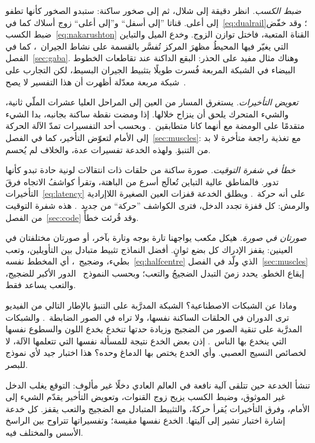 \emph{ضبط الكسب.} انظر دقيقة إلى شلال، ثم إلى صخور ساكنة: ستبدو الصخور كأنها تطفو إلى أعلى. قناتا ”إلى أسفل“ و”إلى أعلى“ زوج أسلاك كما في~\eqref{eq:dualrail}؛ وقد خفّض ضبط الكسب~\eqref{eq:nakarushton} القناة المتعبة، فاختل توازن الزوج. وخدع الميل والتباين التي يغيّر فيها المحيطُ مظهرَ المركز تُفسَّر بالقسمة على نشاط الجيران~\cite{Schwartz2009}، كما في الفصل~\ref{sec:gaba}. وهناك مثال مفيد على الحذر: البقع الداكنة عند تقاطعات الخطوط البيضاء في الشبكة المربعة فُسرت طويلًا بتثبيط الجيران البسيط، لكن التجارب على شبكة مربعة معدّلة أظهرت أن هذا التفسير لا يصح~\cite{SchillerCarvey2005}.

\emph{تعويض التأخيرات.} يستغرق المسار من العين إلى المراحل العليا عشرات الملّي ثانية، والشيء المتحرك يلحق أن ينزاح خلالها. إذا ومضت نقطة ساكنة بجانبه، بدا الشيء متقدمًا على الومضة مع أنهما كانا متطابقين~\cite{Nijhawan1994}. وبحسب أحد التفسيرات تمدّ الآلة الحركة إلى الأمام لتعوّض التأخير، كما في الفصل~\ref{sec:muscles}: مع تغذية راجعة متأخرة لا بد من التنبؤ. ولهذه الخدعة تفسيرات عدة، والخلاف لم يُحسم.

\emph{خطأ في شفرة التوقيت.} صورة ساكنة من حلقات ذات انتقالات لونية حادة تبدو كأنها تدور. فالمناطق عالية التباين تُعالَج أسرع من الباهتة، وتقرأ كواشفُ الاتجاه فرقَ التأخيرات~\eqref{eq:latency} على أنه حركة~\cite{Conway2005}. ويطلق الخدعة قفزات العين الصغيرة اللاإرادية والرمش: كل قفزة تجدد الدخل، فترى الكواشف ”حركة“ من جديد~\cite{OteroMillan2012}. هذه شفرة التوقيت من الفصل~\ref{sec:code} وقد قُرئت خطأً.

\emph{صورتان في صورة.} هيكل مكعب يواجهنا تارة بوجه وتارة بآخر، أو صورتان مختلفتان في العينين: يقفز الإدراك كل بضع ثوانٍ. أفضل النماذج تثبيط متبادل بين التأويلين، وتعب بطيء، وضجيج~\cite{MorenoBote2007}، أي المخطط نفسه~\eqref{eq:halfcentre} الذي ولّد في الفصل~\ref{sec:muscles} إيقاع الخطو. يحدد زمنَ التبدل الضجيجُ والتعب؛ وبحسب النموذج~\cite{MorenoBote2007} الدور الأكبر للضجيج، والتعب يساعد فقط.

وماذا عن الشبكات الاصطناعية؟ الشبكة المدرَّبة على التنبؤ بالإطار التالي من الفيديو ترى الدوران في الحلقات الساكنة نفسها، ولا تراه في الصور الضابطة~\cite{Watanabe2018}. والشبكات المدرَّبة على تنقية الصور من الضجيج وزيادة حدتها تنخدع بخدع اللون والسطوع نفسها التي ينخدع بها الناس~\cite{GomezVilla2020}. إذن بعض الخدع نتيجة للمسألة نفسها التي تتعلمها الآلة، لا لخصائص النسيج العصبي. وأي الخدع يختص بها الدماغ وحده؟ هذا اختبار جيد لأي نموذج للبصر.

\begin{keyblock}
\begin{proposition}
\label{prop:illusions}
تنشأ الخدعة حين تتلقى آلية نافعة في العالم العادي دخلًا غير مألوف: التوقع يغلب الدخل غير الموثوق، وضبط الكسب يزيح زوج القنوات، وتعويض التأخير يقدّم الشيء إلى الأمام، وفرق التأخيرات يُقرأ حركةً، والتثبيط المتبادل مع الضجيج والتعب يقفز. كل خدعة إشارة اختبار تشير إلى آليتها. الخدع نفسها مقيسة؛ وتفسيراتها تتراوح بين الراسخ الأسس والمختلف فيه.
\end{proposition}
\end{keyblock}

